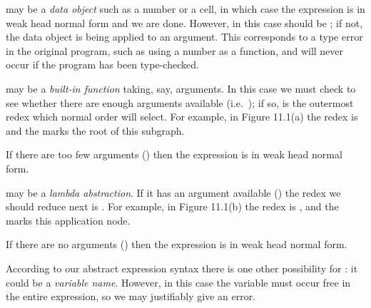 \begin{numbered}
    \item {} may be a \textit{data object} such as a number or a  cell, in which case the
    expression is in weak head normal form and we are done. However, in
    this case  should be ; if not, the data object is being applied to an
    argument. This corresponds to a type error in the original program, such
    as using a number as a function, and will never occur if the program has
    been type-checked.
    \item {} may be a \textit{built-in function} taking, say,  arguments. In this case we must
    check to see whether there are enough arguments available (i.e.\ );
    if so,  is the outermost redex which normal order will select.
    For example, in Figure 11.1(a) the redex is  and the \ml{\$}
    marks the root of this subgraph.

    \hspace{15pt} If there are too few arguments () then the expression is in weak
    head normal form.
    \item {} may be a \textit{lambda abstraction}. If it has an argument available () the
    redex we should reduce next is . For example, in Figure 11.1(b) the
    redex is , and the \ml{\$} marks this application node.

    \hspace{15pt} If there are no arguments () then the expression is in weak head
    normal form.
\end{numbered}

According to our abstract expression syntax there is one other possibility
for : it could be a \textit{variable name}. However, in this case the variable must occur
free in the entire expression, so we may justifiably give an error.

